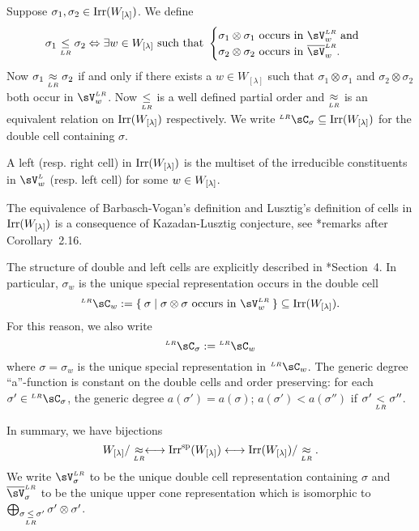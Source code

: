\documentclass[counting_main.tex]{subfiles}
\begin{document}
Suppose $\sigma_{1}, \sigma_{2}\in \mathrm{Irr}(W_{[\lambda]})$. We define
\[
  \sigma_{1}\leqLR \sigma_{2} \Leftrightarrow \exists w\in W_{[\lambda]} \text{
    such that }
  \begin{cases}
    \sigma_{1} \otimes \sigma_{1} \text{ occurs in } \VLR_{w}
    \text{ and } \\
    \sigma_{2} \otimes \sigma_{2} \text{ occurs in } \bVLR_{w}.
  \end{cases}
\]
Now $\sigma_{1}\mathrel{\mathop{\approx}\limits_{\scriptscriptstyle LR}} \sigma_{2}$ if and only if there exists a
$w\in W_{[\lambda]}$ such that $\sigma_{1} \otimes \sigma_{1}$ and
$\sigma_{2} \otimes \sigma_{2}$ both occur in $\VLR_{w}$. Now $\mathrel{\mathop{\leq}\limits_{\scriptscriptstyle LR}}$ is a well
defined partial order and $\mathrel{\mathop{\approx}\limits_{\scriptscriptstyle LR}}$ is an equivalent relation on
$\mathrm{Irr}(W_{[\lambda]})$ respectively. We write
$\LRC_{\sigma}\subseteq \Irr(\Wlam)$ for the double cell containing $\sigma$.

A left (resp. right cell) in $\mathrm{Irr}(W_{[\lambda]})$ is the multiset of the irreducible
constituents in $\VL_{w}$ (resp. left cell) for some $w\in W_{[\lambda]}$.

The equivalence of Barbasch-Vogan's definition and Lusztig's definition of cells
in $\mathrm{Irr}(W_{[\lambda]})$ is a consequence of Kazadan-Lusztig conjecture, see
\cite{BV2}*{remarks after Corollary~2.16}.

The structure of double and left cells are explicitly described in
\cite{Lu}*{Section~4}. In particular, $\sigma_{w}$ is the unique special
representation occurs in the double cell
\[
  \LRC_{w}:= \Set{\sigma| \sigma\otimes \sigma \text{ occurs in
    } \VLR_{w}} \subseteq \Irr(\Wlam).
\]
For this reason, we also write
\[
  \LRC_{\sigma}:=\LRC_{w}
\]
where $\sigma=\sigma_{w}$ is the unique special representation in $\LRC_{w}$.
The generic degree ``a''-function is constant on the double cells and order
preserving: for each $\sigma'\in \LRC_{\sigma}$, the generic degree
$a(\sigma')=a(\sigma)$; $a(\sigma')<a(\sigma'')$ if $\sigma'\mathrel{\mathop{<}\limits_{\scriptscriptstyle LR}} \sigma''$.

In summary, we have bijections
\[
  W_{[\lambda]}/\mathrel{\mathop{\approx}\limits_{\scriptscriptstyle LR}} \longleftrightarrow\mathrm{Irr}^{\text{sp}}(W_{[\lambda]})\longleftrightarrow \mathrm{Irr}(W_{[\lambda]})/\mathrel{\mathop{\approx}\limits_{\scriptscriptstyle LR}}.
\]
We write $\VLR_{\sigma}$ to be the unique double cell representation containing
$\sigma$ and $\bVLR_{\sigma}$ to be the unique upper cone representation which
is isomorphic to $\bigoplus_{\sigma\mathrel{\mathop{\leq}\limits_{\scriptscriptstyle LR}} \sigma'}\sigma'\otimes \sigma'$.
\end{document}
